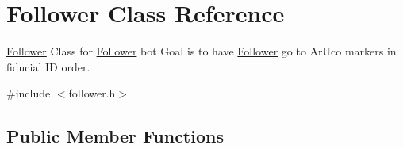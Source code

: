 \hypertarget{class_follower}{}\section{Follower Class Reference}
\label{class_follower}


\hyperlink{class_follower}{Follower} Class for \hyperlink{class_follower}{Follower} bot Goal is to have \hyperlink{class_follower}{Follower} go to Ar\+Uco markers in fiducial ID order.  




{\ttfamily \#include $<$follower.\+h$>$}

\subsection*{Public Member Functions}
